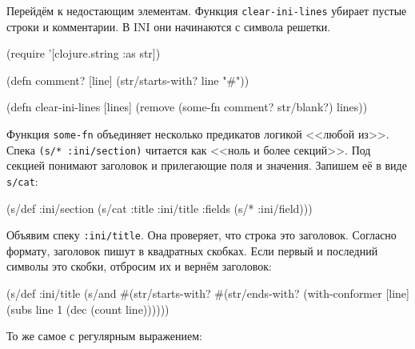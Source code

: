 
Перейдём к недостающим элементам. Функция \verb|clear-ini-lines| убирает
пустые строки и комментарии. В INI они начинаются с символа решетки.

\begin{english}
  \begin{clojure}
(require '[clojure.string :as str])

(defn comment? [line]
  (str/starts-with? line "#"))

(defn clear-ini-lines [lines]
  (remove (some-fn comment? str/blank?) lines))
  \end{clojure}
\end{english}


Функция \verb|some-fn| объединяет несколько предикатов логикой <<любой
из>>. Спека \verb|(s/* :ini/section)| читается как <<ноль и более
секций>>. Под секцией понимают заголовок и прилегающие поля и значения. Запишем
её в виде \verb|s/cat|:

\begin{english}
  \begin{clojure}
(s/def :ini/section
  (s/cat :title :ini/title :fields (s/* :ini/field)))
  \end{clojure}
\end{english}

Объявим спеку \verb|:ini/title|. Она проверяет, что строка это
заголовок. Согласно формату, заголовок пишут в квадратных скобках. Если первый и
последний символы это скобки, отбросим их и вернём заголовок:

\begin{english}
  \begin{clojure}
(s/def :ini/title
  (s/and
   #(str/starts-with? %
   #(str/ends-with? %
   (with-conformer [line]
     (subs line 1 (dec (count line))))))
  \end{clojure}
\end{english}

\noindent
То же самое с регулярным выражением:

\begin{english}
\end{english}

